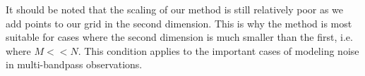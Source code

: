 \documentclass[preprint2]{aastex62}
\newcommand{\bvec}[1]{{\ensuremath{\boldsymbol{#1}}}}
\newcommand{\expandvec}[2]{\left(\begin{array}{ccccc} #1\quad && \cdots\quad && #2 \end{array}\right)}
\begin{document}
	It should be noted that the scaling of our method is still relatively poor as we add points to our grid in the second dimension. This 
	is why the method is most suitable for cases where the second dimension is much smaller than the first, i.e. where $M << N$. 
	This condition applies to the important cases of modeling noise in multi-bandpass observations. 
	
\end{document}
